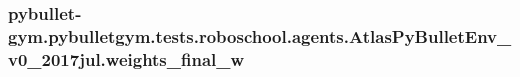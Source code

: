 \subsubsection[{\texorpdfstring{weights\+\_\+final\+\_\+w}{weights_final_w}}]{\setlength{\rightskip}{0pt plus 5cm}pybullet-\/gym.\+pybulletgym.\+tests.\+roboschool.\+agents.\+Atlas\+Py\+Bullet\+Env\+\_\+v0\+\_\+2017jul.\+weights\+\_\+final\+\_\+w}\hypertarget{namespacepybullet-gym_1_1pybulletgym_1_1tests_1_1roboschool_1_1agents_1_1_atlas_py_bullet_env__v0__2017jul_a0c979d4b25a43b6341f44d288bb0f11d}{}\label{namespacepybullet-gym_1_1pybulletgym_1_1tests_1_1roboschool_1_1agents_1_1_atlas_py_bullet_env__v0__2017jul_a0c979d4b25a43b6341f44d288bb0f11d}
